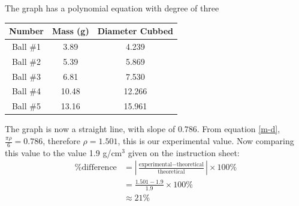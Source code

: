 \documentclass{article}
\begin{document}
The graph has a polynomial equation with degree of three

\begin{center}
\begin{tabular}{|c|c|c|}
\hline
Number&	Mass (g)&	Diameter Cubbed\\\hline
Ball \#1	&3.89	&4.239\\\hline
Ball \#2	&5.39	&5.869\\\hline
Ball \#3	&6.81	&7.530\\\hline
Ball \#4	&10.48	&12.266\\\hline
Ball \#5	&13.16	&15.961\\\hline
\end{tabular}
\end{center}

\begin{center}
\label{m-d^3}
\end{center}
The graph is now a straight line, with slope of $0.786$. From equation \ref{m-d}, $\frac{\pi\rho}{6}=0.786$, therefore $\rho=1.501$, this is our experimental value. Now comparing this value to the value 1.9 g/cm$^3$ given on the instruction sheet:
\begin{align*}
    \% \text{difference}&=\left|\frac{\text{experimental}-\text{theoretical}}{\text{theoretical}}\right|\times 100\%\\
    &=\frac{1.501-1.9}{1.9}\times 100\%\\
    &\approx 21\%
\end{align*}
\end{document}

